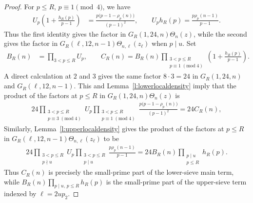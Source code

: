 \documentclass[12pt,reqno]{amsart}
\numberwithin{equation}{section}
\theoremstyle{definition}
\theoremstyle{remark}
\begin{document}
\begin{proof}
For \(p\leq R\), \(p\equiv1\pmod4\), we have
\begin{align}\label{e:smallprimecancel10}
 U_p\left(1+\frac{h_R(p)}{p-1}\right)
 &=
 \frac{p\bigl(p-1-\rho_p(n)\bigr)}{(p-1)^2},
 \qquad
 U_ph_R(p)=\frac{p\rho_p(n-1)}{p-1}.
\end{align}
Thus the first identity gives the factor in
\(G_R(1,24,n)\Theta_n(z)\), while the second gives the factor in
\(G_R(\ell,12,n-1)\Theta_{n,\ell}(z_\ell)\) when \(p\mid u\).
Set
\begin{align}\label{e:BRCR10}
 B_R(n)&=\prod_{3<p\leq R}U_p,\qquad
 C_R(n)=
 B_R(n)
 \prod_{\substack{3<p\leq R\\p\equiv1\;(\mathrm{mod}\;4)}}
 \left(1+\frac{h_R(p)}{p-1}\right).
\end{align}
A direct calculation at \(2\) and \(3\) gives the same factor
\(8\cdot3=24\) in \(G_R(1,24,n)\) and
\(G_R(\ell,12,n-1)\). This and Lemma~\ref{l:lowerlocaldensity} imply that the product of the factors at \(p\leq R\) in
\(G_R(1,24,n)\Theta_n(z)\) is
\begin{align}\label{e:smallprimelower10}
    24
 \prod_{\substack{3<p\leq R\\p\equiv3\;(\mathrm{mod}\;4)}}U_p
 \prod_{\substack{3<p\leq R\\p\equiv1\;(\mathrm{mod}\;4)}}
 \frac{p\bigl(p-1-\rho_p(n)\bigr)}{(p-1)^2}
 =24C_R(n),
\end{align}
Similarly, Lemma~\ref{l:upperlocaldensity} gives the product of the factors at \(p\leq R\) in
\(G_R(\ell,12,n-1)\Theta_{n,\ell}(z_\ell)\) to be
\begin{align}\label{e:smallprimeupper10}
     24
 \prod_{\substack{3<p\leq R\\p\nmid u}}U_p
 \prod_{\substack{3<p\leq R\\p\mid u}}
 \frac{p\rho_p(n-1)}{p-1}
 =
 24B_R(n)
 \prod_{\substack{p\mid u\\p\leq R}}h_R(p).
\end{align}
Thus \(C_R(n)\) is precisely the small-prime part of the lower-sieve
main term, while \(B_R(n)\prod_{p\mid u,\,p\leq R}h_R(p)\) is the
small-prime part of the upper-sieve term indexed by
\(\ell=2up_2\).


\end{proof}
\end{document}
